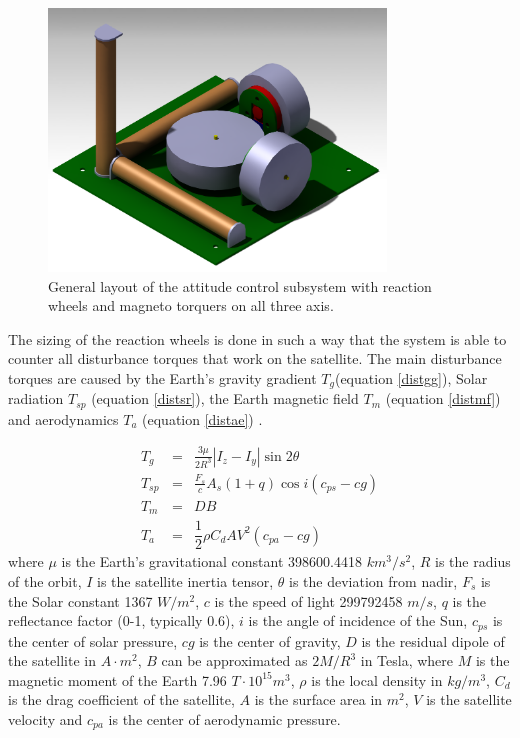 \begin{figure} [h]
\centering
\includegraphics[width=0.8\textwidth, bb=0 0 1106px 861px]{chapters/img/AC_setup.png}
\caption[General layout of the attitude control subsystem]{General layout of the attitude control subsystem with reaction wheels and magneto torquers on all three axis.}
\label{fig:catacs}
\end{figure}

The sizing of the reaction wheels is done in such a way that the system is able to counter all disturbance torques that work on the satellite. The main disturbance torques are caused by the Earth's gravity gradient $T_g$(equation \ref{distgg}), Solar radiation $T_{sp}$ (equation \ref{distsr}), the Earth magnetic field $T_m$ (equation \ref{distmf}) and aerodynamics $T_a$ (equation \ref{distae}) \cite{larson}.

\begin{eqnarray}
T_g \,&=& \frac{3\mu}{2R^3} \left|I_z - I_y \right| \sin{2\theta} \label{distgg} \\
T_{sp} &=& \frac{F_s}{c}A_s\left(1+q\right)\cos{i}\left(c_{ps}-cg\right) \label{distsr} \\
T_m \,&=& DB \label{distmf} \label{distmf} \\
T_a \,&=& \dfrac{1}{2}\rho C_dAV^2 \left(c_{pa} -cg\right) \label{distae}
\end{eqnarray}
where $\mu$ is the Earth's gravitational constant 398600.4418 $km^3/s^2$, $R$ is the radius of the orbit, $I$ is the satellite inertia tensor, $\theta$ is the deviation from nadir, $F_s$ is the Solar constant 1367 $W/m^2$, $c$ is the speed of light 299792458 $m/s$, $q$ is the reflectance factor (0-1, typically 0.6), $i$ is the angle of incidence of the Sun, $c_{ps}$ is the center of solar pressure, $cg$ is the center of gravity, $D$ is the residual dipole of the satellite in $A\cdot m^2$, $B$ can be approximated as $2M/R^3$ in Tesla, where $M$ is the magnetic moment of the Earth 7.96 $T\cdot 10^{15} m^3$, $\rho$ is the local density in $kg/m^3$, $C_d$ is the drag coefficient of the satellite, $A$ is the surface area in $m^2$, $V$ is the satellite velocity and $c_{pa}$ is the center of aerodynamic pressure.

